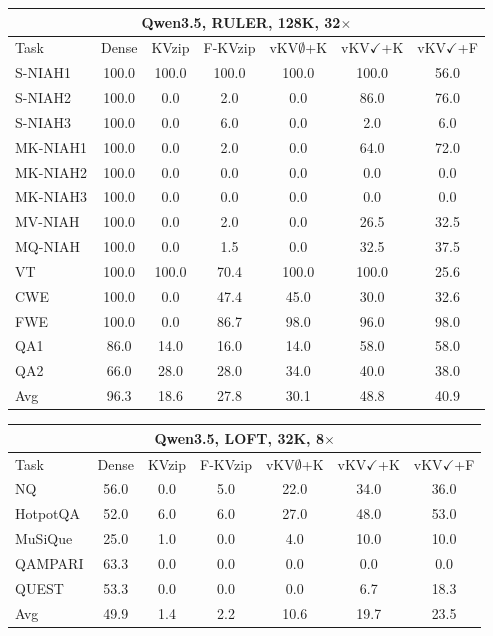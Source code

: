 \begin{tabular}{lcccccc}
\toprule
\multicolumn{7}{c}{Qwen3.5, RULER, 128K, 32$\times$} \\
\midrule
Task & Dense & KVzip & F-KVzip & vKV$\emptyset$+K & vKV$\checkmark$+K & vKV$\checkmark$+F \\
\midrule
S-NIAH1 & 100.0 & 100.0 & 100.0 & 100.0 & 100.0 & 56.0 \\
S-NIAH2 & 100.0 & 0.0 & 2.0 & 0.0 & 86.0 & 76.0 \\
S-NIAH3 & 100.0 & 0.0 & 6.0 & 0.0 & 2.0 & 6.0 \\
MK-NIAH1 & 100.0 & 0.0 & 2.0 & 0.0 & 64.0 & 72.0 \\
MK-NIAH2 & 100.0 & 0.0 & 0.0 & 0.0 & 0.0 & 0.0 \\
MK-NIAH3 & 100.0 & 0.0 & 0.0 & 0.0 & 0.0 & 0.0 \\
MV-NIAH & 100.0 & 0.0 & 2.0 & 0.0 & 26.5 & 32.5 \\
MQ-NIAH & 100.0 & 0.0 & 1.5 & 0.0 & 32.5 & 37.5 \\
VT & 100.0 & 100.0 & 70.4 & 100.0 & 100.0 & 25.6 \\
CWE & 100.0 & 0.0 & 47.4 & 45.0 & 30.0 & 32.6 \\
FWE & 100.0 & 0.0 & 86.7 & 98.0 & 96.0 & 98.0 \\
QA1 & 86.0 & 14.0 & 16.0 & 14.0 & 58.0 & 58.0 \\
QA2 & 66.0 & 28.0 & 28.0 & 34.0 & 40.0 & 38.0 \\
\midrule
Avg & 96.3 & 18.6 & 27.8 & 30.1 & 48.8 & 40.9 \\
\bottomrule
\end{tabular}
\vspace{0.8em}

\begin{tabular}{lcccccc}
\toprule
\multicolumn{7}{c}{Qwen3.5, LOFT, 32K, 8$\times$} \\
\midrule
Task & Dense & KVzip & F-KVzip & vKV$\emptyset$+K & vKV$\checkmark$+K & vKV$\checkmark$+F \\
\midrule
NQ & 56.0 & 0.0 & 5.0 & 22.0 & 34.0 & 36.0 \\
HotpotQA & 52.0 & 6.0 & 6.0 & 27.0 & 48.0 & 53.0 \\
MuSiQue & 25.0 & 1.0 & 0.0 & 4.0 & 10.0 & 10.0 \\
QAMPARI & 63.3 & 0.0 & 0.0 & 0.0 & 0.0 & 0.0 \\
QUEST & 53.3 & 0.0 & 0.0 & 0.0 & 6.7 & 18.3 \\
\midrule
Avg & 49.9 & 1.4 & 2.2 & 10.6 & 19.7 & 23.5 \\
\bottomrule
\end{tabular}
\vspace{0.8em}

